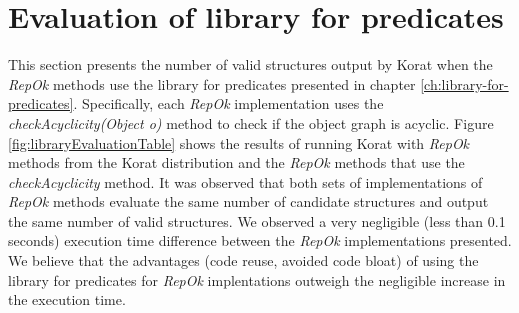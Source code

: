 \section{Evaluation of library for predicates}
\label{sec:evaluation-of-library-for-predicates}
This section presents the number of valid structures output by Korat when the
\emph{RepOk} methods use the library for predicates presented in
chapter \ref{ch:library-for-predicates}. Specifically, each
\emph{RepOk} implementation uses the \emph{checkAcyclicity(Object o)}
method to check if the object graph is acyclic. Figure
\ref{fig:libraryEvaluationTable} shows the results of running Korat
with \emph{RepOk} methods from the Korat distribution and the
\emph{RepOk} methods that use the \emph{checkAcyclicity} method. It
was observed that both sets of implementations of \emph{RepOk} methods
evaluate the same number of candidate structures and output the same
number of valid structures. We observed a very negligible (less than 0.1
seconds) execution time difference between the \emph{RepOk}
implementations presented. We believe that the advantages (code reuse,
avoided code bloat) of using the library for predicates for
\emph{RepOk} implentations outweigh the negligible increase in the
execution time.

